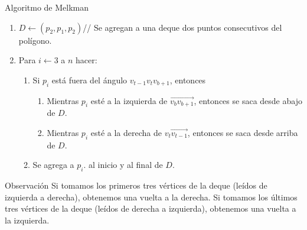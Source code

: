 \documentclass[aspectratio=169,xcolor=dvipsnames, t]{beamer}
\begin{document}
\begin{frame}{Algoritmo de Melkman}
  \begin{enumerate}
  \item $D\gets (p_{2},p_{1},p_{2}) $// Se agregan a una deque dos puntos consecutivos del polígono.
  \item Para $i\gets 3$ a $n$ hacer:
    \begin{enumerate}
    \item Si $p_{i}$ está fuera del ángulo $v_{t-1}v_tv_{b+1}$, entonces
      \begin{enumerate}
      \item Mientras $p_{i}$ esté a la izquierda de $\overrightarrow{v_{b}v_{b+1}}$, entonces se saca desde abajo de $D$.
      \item Mientras $p_{i}$ esté a la derecha de $\overrightarrow{v_{t}v_{t-1}}$, entonces se saca desde arriba de $D$.
      \end{enumerate}
    \item Se agrega a $p_{i}$. al inicio y al final de $D$.
    \end{enumerate}
  \end{enumerate}
  \begin{block}{Observación}
    \small
    Si tomamos los primeros tres vértices de la deque (leídos de izquierda a derecha), obtenemos una vuelta a la derecha. Si tomamos los últimos tres vértices de la deque (leídos de derecha a izquierda), obtenemos una vuelta a la izquierda.
  \end{block}
\end{frame}
\end{document}
